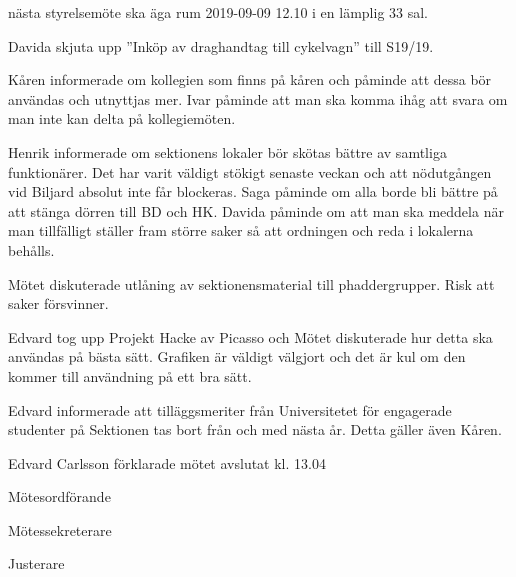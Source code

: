 \documentclass[10pt]{article}
\def\mo{Edvard Carlsson}
\def\ms{Mattias Lundström}
\def\ji{Saga Åslund}
\begin{document}
\begin{paragrafer}
\Mba nästa styrelsemöte ska äga rum 2019-09-09 12.10 i en lämplig 33 sal.

Davida \ypa skjuta upp ''Inköp av draghandtag till cykelvagn'' till S19/19.

\Mbaby

Kåren informerade om kollegien som finns på kåren och påminde att dessa bör användas och utnyttjas mer. Ivar påminde att man ska komma ihåg att svara om man inte kan delta på kollegiemöten. 

Henrik informerade om sektionens lokaler bör skötas bättre av samtliga funktionärer. Det har varit väldigt stökigt senaste veckan och att nödutgången vid Biljard absolut inte får blockeras.
Saga påminde om alla borde bli bättre på att stänga dörren till BD och HK.  
Davida påminde om att man ska meddela när man tillfälligt ställer fram större saker så att ordningen och reda i lokalerna behålls.

Mötet diskuterade utlåning av sektionensmaterial till phaddergrupper. Risk att saker försvinner.

Edvard tog upp Projekt Hacke av Picasso och Mötet diskuterade hur detta ska användas på bästa sätt. Grafiken är väldigt välgjort och det är kul om den kommer till användning på ett bra sätt. 

Edvard informerade att tilläggsmeriter från Universitetet för engagerade studenter på Sektionen tas bort från och med nästa år. Detta gäller även Kåren.


{\mo} förklarade mötet avslutat kl. 13.04
\end{paragrafer}

\hidesignfoot
\begin{signatures}{3}
\signature{\mo}{Mötesordförande}
\signature{\ms}{Mötessekreterare}
\signature{\ji}{Justerare}
\end{signatures}
\end{document}
